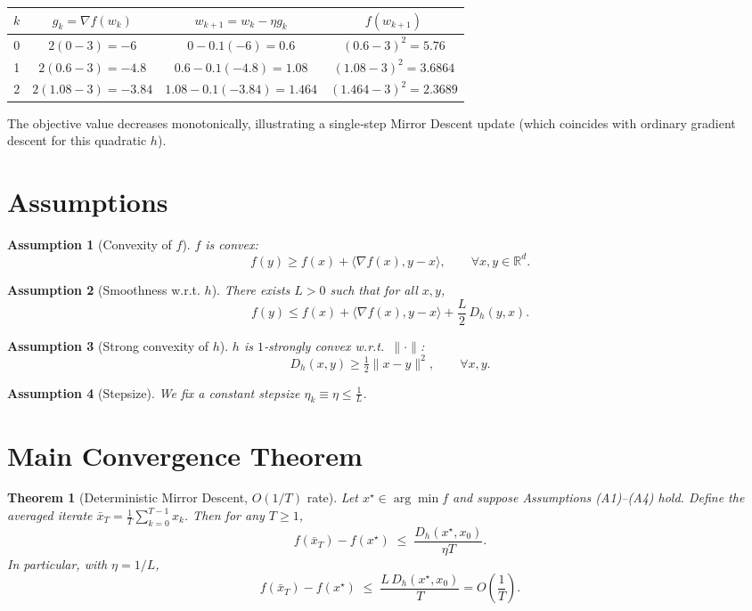 \documentclass{article}
\newtheorem{theorem}{Theorem}
\newtheorem{assumption}{Assumption}
\newcommand{\Breg}[2]{D_{h}(#1,#2)}
\newcommand{\inner}[2]{\langle #1,#2\rangle}
\newcommand{\grad}{\nabla}
\begin{document}
\begin{center}
\begin{tabular}{c|c|c|c}
$k$ & $g_k=\grad f(w_k)$ & $w_{k+1}=w_k-\eta g_k$ & $f(w_{k+1})$\\ \hline
0 & $2(0-3)=-6$ & $0-0.1(-6)=0.6$ & $(0.6-3)^2=5.76$\\
1 & $2(0.6-3)=-4.8$ & $0.6-0.1(-4.8)=1.08$ & $(1.08-3)^2=3.6864$\\
2 & $2(1.08-3)=-3.84$ & $1.08-0.1(-3.84)=1.464$ & $(1.464-3)^2=2.3689$
\end{tabular}
\end{center}
The objective value decreases monotonically, illustrating a single‑step
Mirror Descent update (which coincides with ordinary gradient descent for this
quadratic $h$).

\vspace{1em}
\section*{Assumptions}
\begin{assumption}[Convexity of $f$]
$f$ is convex:
\[
f(y)\ge f(x)+\inner{\grad f(x)}{y-x},\qquad\forall x,y\in\mathbb{R}^{d}.
\tag{A1}
\]
\end{assumption}
\begin{assumption}[Smoothness w.r.t. $h$]
There exists $L>0$ such that for all $x,y$,
\[
f(y)\le f(x)+\inner{\grad f(x)}{y-x}+ \frac{L}{2}\,\Breg{y}{x}.
\tag{A2}
\]
\end{assumption}
\begin{assumption}[Strong convexity of $h$]
$h$ is $1$‑strongly convex w.r.t.\ $\|\cdot\|$:
\[
\Breg{x}{y}\ge \tfrac12\|x-y\|^{2},\qquad\forall x,y.
\tag{A3}
\]
\end{assumption}
\begin{assumption}[Stepsize]
We fix a constant stepsize $\eta_k\equiv\eta\le \frac{1}{L}$.
\end{assumption}

\vspace{1em}
\section*{Main Convergence Theorem}
\begin{theorem}[Deterministic Mirror Descent, $O(1/T)$ rate]\label{thm:md}
Let $x^{\star}\in\arg\min f$ and suppose Assumptions (A1)–(A4) hold.
Define the averaged iterate $\bar{x}_T = \frac1T\sum_{k=0}^{T-1}x_k$.
Then for any $T\ge1$,
\[
f(\bar{x}_T)-f(x^{\star})\;\le\;
\frac{\Breg{x^{\star}}{x_0}}{\eta T}.
\tag{2}
\]
In particular, with $\eta=1/L$,
\[
f(\bar{x}_T)-f(x^{\star})\;\le\;
\frac{L\,\Breg{x^{\star}}{x_0}}{T}=O\!\left(\frac{1}{T}\right).
\]
\end{theorem}
\end{document}
